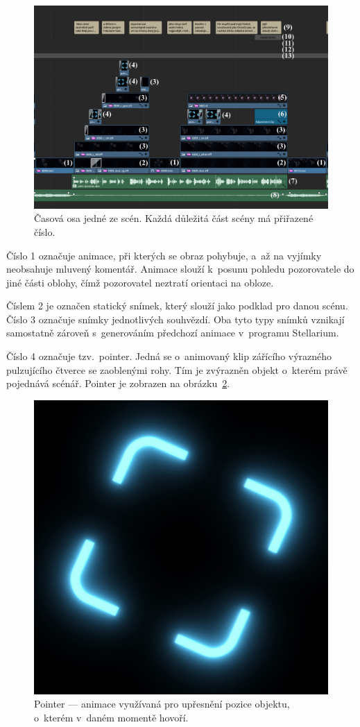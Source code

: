 \documentclass[12pt,a4paper,titlepage]{article}
\begin{document}
\begin{figure}[H]
	\centering
	\includegraphics[width=1\textwidth]{timeline_annotated.eps}
	\caption{Časová osa jedné ze scén. Každá důležitá část scény má přiřazené číslo.}\label{img:timeline}
\end{figure}
Číslo 1 označuje animace, při kterých se obraz pohybuje, a~až na vyjímky neobsahuje mluvený komentář. Animace slouží k~posunu pohledu pozorovatele do jiné části oblohy, čímž pozorovatel neztratí orientaci na obloze. 

Číslem 2 je označen statický snímek, který slouží jako podklad pro danou scénu. Číslo 3 označuje snímky jednotlivých souhvězdí. Oba tyto typy snímků vznikají samostatně zároveň s~generováním předchozí animace v~programu Stellarium.

Číslo 4 označuje tzv.\ pointer. Jedná se o~animovaný klip zářícího výrazného pulzujícího čtverce se zaoblenými rohy. Tím je zvýrazněn objekt o~kterém právě pojednává scénář. Pointer je zobrazen na obrázku~\ref{img:pointer}. 

\begin{figure}[H]
	\centering
	\includegraphics[width=.5\textwidth]{pointer.eps}
	\caption{Pointer --- animace využívaná pro upřesnění pozice objektu, o~kterém v~daném momentě hovoří.}\label{img:pointer}
\end{figure}
\end{document}

